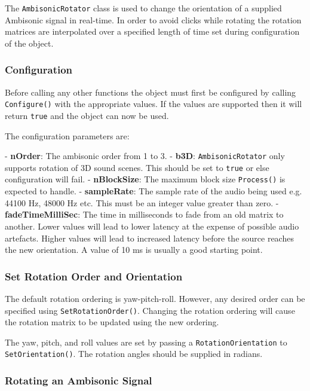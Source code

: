 \documentclass[12pt]{report}
\newcommand{\code}[1]{\texttt{#1}}
\begin{document}
The \code{AmbisonicRotator} class is used to change the orientation of a supplied Ambisonic signal in real-time. In order to avoid clicks while rotating the rotation matrices are interpolated over a specified length of time set during configuration of the object.

\subsubsection{Configuration}

Before calling any other functions the object must first be configured by calling \code{Configure()} with the appropriate values. If the values are supported then it will return \code{true} and the object can now be used.

The configuration parameters are:

- \textbf{nOrder}: The ambisonic order from 1 to 3.
- \textbf{b3D}: \code{AmbisonicRotator} only supports rotation of 3D sound scenes. This should be set to \code{true} or else configuration will fail.
- \textbf{nBlockSize}: The maximum block size \code{Process()} is expected to handle.
- \textbf{sampleRate}: The sample rate of the audio being used e.g. 44100 Hz, 48000 Hz etc. This must be an integer value greater than zero.
- \textbf{fadeTimeMilliSec}: The time in milliseconds to fade from an old matrix to another. Lower values will lead to lower latency at the expense of possible audio artefacts. Higher values will lead to increased latency before the source reaches the new orientation. A value of 10 ms is usually a good starting point.

\subsubsection{Set Rotation Order and Orientation}

The default rotation ordering is yaw-pitch-roll. However, any desired order can be specified using \code{SetRotationOrder()}. Changing the rotation ordering will cause the rotation matrix to be updated using the new ordering.

The yaw, pitch, and roll values are set by passing a \code{RotationOrientation} to \code{SetOrientation()}. The rotation angles should be supplied in radians.

\subsubsection{Rotating an Ambisonic Signal}
\end{document}
